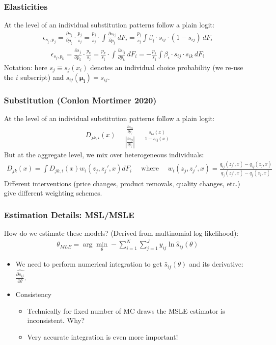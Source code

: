 \begin{frame}
\frametitle{Elasticities}
At the level of an individual substitution patterns follow a plain logit:
\begin{align*}
\epsilon_{s_j,p_j} = \frac{\partial s_{j}}{\partial p_j} \cdot \frac{p_j}{s_{j}}
=\frac{p_j}{s_{j}}  \cdot \int \frac{\partial s_{ij}}{\partial p_j}  \, d F_i 
= \frac{p_j}{s_{j}}  \int \beta_i \cdot s_{ij} \cdot (1-s_{ij} ) \,d F_i 
\end{align*}
\begin{align*}
\epsilon_{s_j,p_k} = \frac{\partial s_{j}}{\partial p_k} \cdot \frac{p_k}{s_{j}}
=\frac{p_k}{s_{j}}  \cdot \int \frac{\partial s_{ij}}{\partial p_k} \,  d F_i 
=- \frac{p_k}{s_{j}}  \int \beta_i \cdot s_{ij}\cdot s_{ik}\, d F_i 
\end{align*}
Notation: here $s_j \equiv s_j(x_i)$ denotes an individual choice probability (we re-use the $i$ subscript) and $s_{ij}(\boldsymbol{\mu_{i}})=s_{ij}$.
\end{frame}





\begin{frame}
\frametitle{Substitution (Conlon Mortimer 2020)}
At the level of an individual substitution patterns follow a plain logit:
\begin{align*}
D_{jk,i}(x) = \frac{\frac{\partial s_{ik}}{\partial p_j}}{\left| \frac{\partial s_{ij}}{\partial p_j} \right|} = \frac{s_{ik}(x)}{1-s_{ij}(x)}
\end{align*}
But at the aggregate level, we mix over heterogeneous individuals:
\begin{align*}
D_{jk}(x) = \int D_{jk,i}(x) w_i(z_j,z_j',x) d F_i \quad  \text{ where }
\quad w_i(z_j,z_j',x) = \frac{q_{ij}(z_j',x)-q_{ij}(z_j,x)}{q_{j}(z_j',x)-q_{j}(z_j,x)}
\end{align*}
Different interventions (price changes, product removals, quality changes, etc.) give different weighting schemes.
\end{frame}


\begin{frame}
\frametitle{Estimation Details: MSL/MSLE}
How do we estimate these models? (Derived from multinomial log-likelihood):
\begin{align*}
\theta_{MLE} = \arg \min_{\theta} - \sum_{i=1}^N \sum_{j=1}^J y_{ij} \ln \widehat{s}_{ij}(\theta)
\end{align*}

\begin{itemize}
\item We need to perform numerical integration to get $\widehat{s}_{ij}(\theta)$ and its derivative: $\widehat{\frac{\partial s_{ij}}{\partial \theta}}$.
\item Consistency
\begin{itemize}
\item Technically for fixed number of MC draws the MSLE estimator is inconsistent. Why?
\item Very accurate integration is even more important!
\end{itemize}
\end{itemize}

\end{frame}


